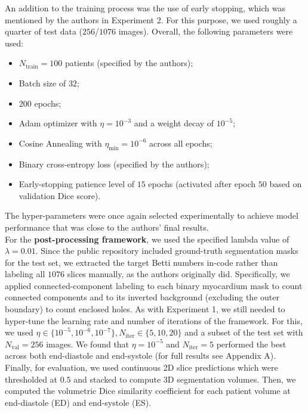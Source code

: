 An addition to the training process was the use of early stopping, which was mentioned by the authors in Experiment 2. For this purpose, we used roughly a quarter of test data ($256$/$1076$ images). Overall, the following parameters were used:
\begin{itemize}
    \item $N_\text{train}=100$ patients (specified by the authors);
    \item Batch size of $32$;
    \item $200$ epochs;
    \item Adam optimizer with $\eta=10^{-3}$ and a weight decay of $10^{-5}$;
    \item Cosine Annealing with $\eta_\text{min} = 10^{-6}$ across all epochs;
    \item Binary cross-entropy loss (specified by the authors);
    \item Early-stopping patience level of $15$ epochs (activated after epoch $50$ based on validation Dice score).
\end{itemize}
The hyper-parameters were once again selected experimentally to achieve model performance that was close to the authors' final results. \\

For the \textbf{post-processing framework}, we used the specified lambda value of $\lambda = 0.01$. Since the public repository included ground-truth segmentation masks for the test set, we extracted the target Betti numbers in-code rather than labeling all $1076$ slices manually, as the authors originally did. Specifically, we applied connected-component labeling to each binary myocardium mask to count connected components and to its inverted background (excluding the outer boundary) to count enclosed holes. As with Experiment 1, we still needed to hyper-tune the learning rate and number of iterations of the framework. For this, we used $\eta\in\{10^{-5}, 10^{-6}, 10^{-7} \}, N_\text{iter} \in \{5, 10, 20 \}$ and a subset of the test set with $N_\text{val} = 256$ images. We found that $\eta=10^{-5}$ and $N_\text{iter}=5$ performed the best across both end-diastole and end-systole (for full results see Appendix A). \\

Finally, for evaluation, we used continuous 2D slice predictions which were thresholded at $0.5$ and stacked to compute 3D segmentation volumes. Then, we computed the volumetric Dice similarity coefficient for each patient volume at end-diastole (ED) and end-systole (ES).


